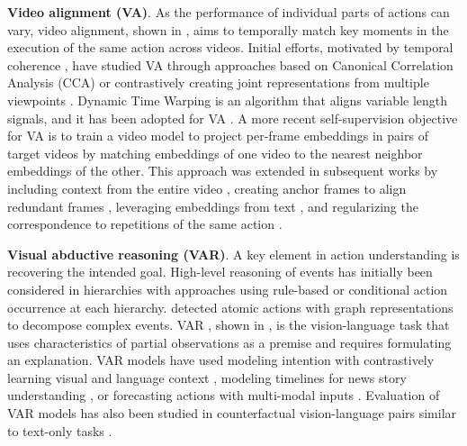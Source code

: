 \noindent
\textbf{Video alignment (VA)}. As the performance of individual parts of actions can vary, video alignment, shown in , aims to temporally match key moments in the execution of the same action across videos. Initial efforts, motivated by temporal coherence \citep{goroshin2015unsupervised,fernando2017self,zhang2023modeling}, have studied VA through approaches based on Canonical Correlation Analysis (CCA) \citep{andrew2013deep} or contrastively creating joint representations from multiple viewpoints \citep{sermanet2018time}. Dynamic Time Warping \citep{sakoe1978dynamic} is an algorithm that aligns variable length signals, and it has been adopted for VA \citep{chang2019d3tw,dvornik2021drop,hadji2021representation}. A more recent self-supervision objective \citep{dwibedi2018temporal} for VA is to train a video model to project per-frame embeddings in pairs of target videos by matching embeddings of one video to the nearest neighbor embeddings of the other. This approach was extended in subsequent works by including context from the entire video \citep{haresh2021learning}, creating anchor frames to align redundant frames \citep{liu2022learning}, leveraging embeddings from text \citep{epstein2021learning}, and regularizing the correspondence to repetitions of the same action \citep{donahue2024learning}.
 

\noindent
\textbf{Visual abductive reasoning (VAR)}. A key element in action understanding is recovering the intended goal. High-level reasoning of events has initially been considered in hierarchies with approaches using rule-based \citep{hakeem2004ontology} or conditional action occurrence \citep{albanese2010pads} at each hierarchy. \citet{pei2011parsing} detected atomic actions with graph representations to decompose complex events. VAR \citep{liang2022visual}, shown in , is the vision-language task that uses characteristics of partial observations as a premise and requires formulating an explanation. VAR models have used modeling intention with contrastively learning visual and language context \citep{li2023intentqa}, modeling timelines for news story understanding \citep{liu2023video}, or forecasting actions with multi-modal inputs \citep{zhu2023personality}. Evaluation of VAR models has also been studied in counterfactual vision-language pairs \citep{park2022exposing} similar to text-only tasks \citep{ippolito2019unsupervised,huang2020inset}.

